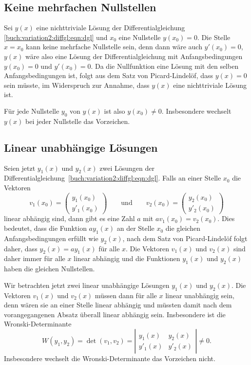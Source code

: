 %
%
\subsection{Keine mehrfachen Nullstellen
\label{buch:variation2:diffgl:subsection:mehrfachenullstellen}}
Sei $y(x)$ eine nichttriviale Lösung der Differentialgleichung
\eqref{buch:variation2:diffgl:eqn:dgl} und $x_0$ eine
Nullstelle $y(x_0)=0$.
Die Stelle $x=x_0$ kann keine mehrfache Nullstelle sein, denn dann
wäre auch $y'(x_0)=0$, $y(x)$ wäre also eine Lösung der Differentialgleichung
mit Anfangsbedingungen $y(x_0)=0$ und $y'(x_0)=0$. 
Da die Nullfunktion eine Lösung mit den selben Anfangsbedingungen ist,
folgt aus dem Satz von Picard-Lindelöf, dass $y(x)=0$ sein müsste, im
Widerspruch zur Annahme, dass $y(x)$ eine nichttriviale Lösung ist.

Für jede Nullstelle $y_0$ von $y(x)$ ist also $y(x_0)\ne 0$.
Insbesondere wechselt $y(x)$ bei jeder Nullstelle das Vorzeichen.


%
%
\subsection{Linear unabhängige Lösungen
\label{buch:variation2:diffgl:subsetion:linunabh}}
Seien jetzt $y_1(x)$ und $y_2(x)$ zwei Lösungen
der Differentialgleichung~\eqref{buch:variation2:diffgl:eqn:dgl}.
Falls an einer Stelle $x_0$ die Vektoren
\[
v_1(x_0)
=
\begin{pmatrix}
y_1(x_0)\\
y'_1(x_0)
\end{pmatrix}
\qquad\text{und}\qquad
v_2(x_0)
=
\begin{pmatrix}
y_2(x_0)\\
y'_2(x_0)
\end{pmatrix}
\]
linear abhängig sind, dann gibt es eine Zahl $a$ mit $av_1(x_0)=v_2(x_0)$.
Dies bedeutet, dass die Funktion $ay_1(x)$ an der Stelle $x_0$ 
die gleichen Anfangsbedingungen erfüllt wie $y_2(x)$, nach dem
Satz von Picard-Lindelöf folgt daher, dass $y_2(x)=ay_1(x)$ für 
%
alle $x$.
Die Vektoren $v_1(x)$ und $v_2(x)$ sind daher immer für alle
$x$ linear abhängig und die Funktionen $y_1(x)$ und $y_2(x)$ haben
die gleichen Nullstellen.

Wir betrachten jetzt zwei linear unabhängige Lösungen
$y_1(x)$ und $y_2(x)$.
Die Vektoren $v_1(x)$ und $v_2(x)$ müssen dann
für alle $x$ linear unabhängig sein, denn wären sie an einer Stelle
linear abhängig und müssten damit nach dem vorangegangenen Absatz
überall linear abhängig sein.
Insbesondere ist die Wronski-Determinante
%
\[
W(y_1,y_2)
=
\det(v_1,v_2)
=
\left|
\begin{matrix}
 y_1(x) &  y_2(x) \\
y'_1(x) & y'_2(x)
\end{matrix}
\right|
\ne
0.
\]
Insbesondere wechselt die Wronski-Determinante das Vorzeichen nicht.

